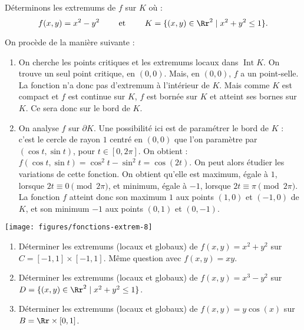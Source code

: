 \documentclass[11pt, class=report,crop=false]{standalone}
\begin{document}



\begin{exemple}
Déterminons les extremums de $f$ sur $K$ où :
$$f(x,y) = x^2 - y^2 \qquad \text{ et } \qquad K = \lbrace (x,y) \in \Rr^2  \mid  x^2 + y^2 \leq 1 \rbrace.$$



On procède de la manière suivante :     
\begin{enumerate}
    \item On cherche les points critiques et les extremums locaux dans $\operatorname{Int} K$.
    On trouve un seul point critique, en $(0,0)$. Mais, en $(0,0)$, $f$ a un point-selle. La fonction n'a donc pas d'extremum à l'intérieur de $K$. Mais comme $K$ est compact et $f$ est continue sur $K$, $f$ est bornée sur $K$ et atteint ses bornes sur $K$. Ce sera donc sur le bord de $K$.
    
    \item On analyse $f$ sur $\partial K$.
    Une possibilité ici est de paramétrer le bord de $K$ : c'est le cercle de rayon $1$ centré en $(0,0)$ que l'on paramètre par $(\cos t,\sin t)$, pour $t\in[0,2\pi]$. On obtient :
    $f(\cos t,\sin t)=\cos^2t-\sin^2t=\cos(2t)$. On peut alors étudier les variations de cette fonction. On obtient qu'elle est maximum, égale à $1$, lorsque $2t \equiv 0 \pmod{2\pi}$, et minimum, égale à $-1$, lorsque $2t \equiv \pi \pmod{2\pi}$. La fonction $f$ atteint donc son maximum $1$ aux points $(1,0)$ et $(-1,0)$ de $K$, et son minimum $-1$ aux points $(0,1)$ et $(0,-1)$.
\end{enumerate}

\begin{center}
  \texttt{[image: figures/fonctions-extrem-8]}
\end{center}

\end{exemple}



\begin{miniexercices}
    \sauteligne
    \begin{enumerate}
        \item Déterminer les extremums (locaux et globaux) de $f(x,y) = x^2+y^2$ sur $C = [-1,1] \times [-1,1]$. Même question avec $f(x,y)= xy$.

        \item Déterminer les extremums (locaux et globaux) de $f(x,y) = x^3-y^2$ sur $D = \lbrace (x,y) \in \Rr^2  \mid  x^2 + y^2 \leq 1 \rbrace$.

        \item Déterminer les extremums (locaux et globaux) de $f(x,y) = y\cos(x)$ sur $B = \Rr \times [0,1]$.
    \end{enumerate}
\end{miniexercices}
\end{document}
